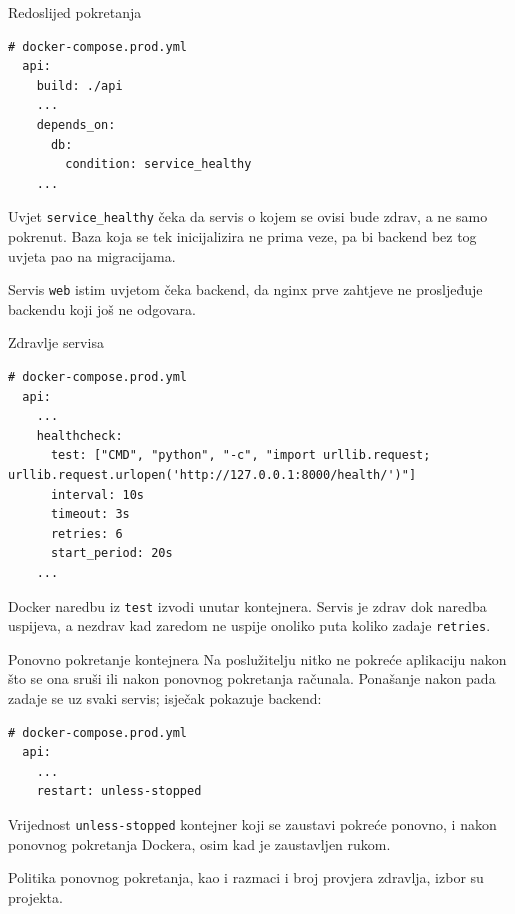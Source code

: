 \begin{frame}[fragile]{Redoslijed pokretanja}
\begin{lstlisting}
# docker-compose.prod.yml
  api:
    build: ./api
    ...
    depends_on:
      db:
        condition: service_healthy
    ...
\end{lstlisting}

\vspace{0.2em}
Uvjet \texttt{service\_healthy} čeka da servis o kojem se ovisi bude zdrav, a ne samo pokrenut. Baza koja se tek inicijalizira ne prima veze, pa bi backend bez tog uvjeta pao na migracijama.

\vspace{0.3em}
Servis \texttt{web} istim uvjetom čeka backend, da nginx prve zahtjeve ne prosljeđuje backendu koji još ne odgovara.
\end{frame}

\begin{frame}[fragile]{Zdravlje servisa}
\begin{lstlisting}
# docker-compose.prod.yml
  api:
    ...
    healthcheck:
      test: ["CMD", "python", "-c", "import urllib.request; urllib.request.urlopen('http://127.0.0.1:8000/health/')"]
      interval: 10s
      timeout: 3s
      retries: 6
      start_period: 20s
    ...
\end{lstlisting}

\vspace{0.3em}
Docker naredbu iz \texttt{test} izvodi unutar kontejnera. Servis je zdrav dok naredba uspijeva, a nezdrav kad zaredom ne uspije onoliko puta koliko zadaje \texttt{retries}.
\end{frame}

\begin{frame}[fragile]{Ponovno pokretanje kontejnera}
Na poslužitelju nitko ne pokreće aplikaciju nakon što se ona sruši ili nakon ponovnog pokretanja računala. Ponašanje nakon pada zadaje se uz svaki servis; isječak pokazuje backend:

\begin{lstlisting}
# docker-compose.prod.yml
  api:
    ...
    restart: unless-stopped
\end{lstlisting}

\vspace{0.3em}
Vrijednost \texttt{unless-stopped} kontejner koji se zaustavi pokreće ponovno, i nakon ponovnog pokretanja Dockera, osim kad je zaustavljen rukom.

\vspace{0.3em}
\begin{konvencija}
Politika ponovnog pokretanja, kao i razmaci i broj provjera zdravlja, izbor su projekta.
\end{konvencija}
\end{frame}

